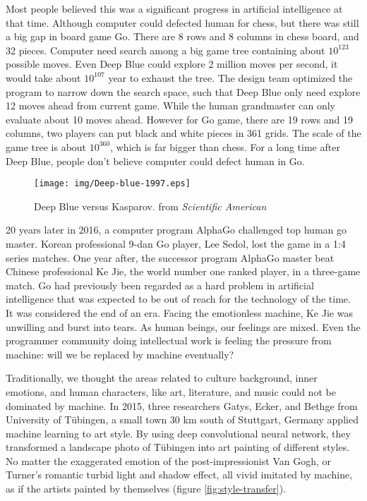 \documentclass{article}
\begin{document}
Most people believed this was a significant progress in artificial intelligence at that time. Although computer could defected human for chess, but there was still a big gap in board game Go. There are 8 rows and 8 columns in chess board, and 32 pieces. Computer need search among a big game tree containing about $10^{123}$ possible moves. Even Deep Blue could explore 2 million moves per second, it would take about $10^{107}$ year to exhaust the tree. The design team optimized the program to narrow down the search space, such that Deep Blue only need explore 12 moves ahead from current game. While the human grandmaster can only evaluate about 10 moves ahead. However for Go game, there are 19 rows and 19 columns, two players can put black and white pieces in 361 grids. The scale of the game tree is about $10^{360}$, which is far bigger than chess. For a long time after Deep Blue, people don't believe computer could defect human in Go.

\begin{figure}[htbp]
 \centering
 \texttt{[image: img/Deep-blue-1997.eps]}
 \captionsetup{labelformat=empty}
 \caption{Deep Blue versus Kasparov. from {\em Scientific American}}
 \label{fig:Deep-blue-1997}
\end{figure}

20 years later in 2016, a computer program AlphaGo challenged top human go master. Korean professional 9-dan Go player, Lee Sedol, lost the game in a 1:4 series matches. One year after, the successor program AlphaGo master beat Chinese professional Ke Jie, the world number one ranked player, in a three-game match. Go had previously been regarded as a hard problem in artificial intelligence that was expected to be out of reach for the technology of the time. It was considered the end of an era. Facing the emotionless machine, Ke Jie was unwilling and burst into tears. As human beings, our feelings are mixed. Even the programmer community doing intellectual work is feeling the pressure from machine: will we be replaced by machine eventually?

Traditionally, we thought the areas related to culture background, inner emotions, and human characters, like art, literature, and music could not be dominated by machine. In 2015, three researchers Gatys, Ecker, and Bethge from University of Tübingen, a small town 30 km south of Stuttgart, Germany applied machine learning to art style. By using deep convolutional neural network, they transformed a landscape photo of Tübingen into art painting of different styles\cite{Gatys-2015}. No matter the exaggerated emotion of the post-impressionist Van Gogh, or Turner's romantic turbid light and shadow effect, all vivid imitated by machine, as if the artists painted by themselves (figure \ref{fig:style-transfer}).
\end{document}
